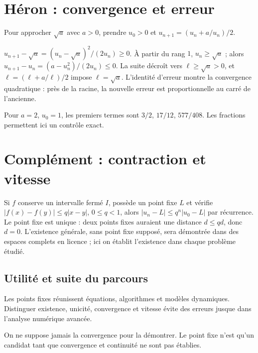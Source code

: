 \documentclass[../cours_tle.tex]{subfiles}
\begin{document}
\section{Héron : convergence et erreur}
Pour approcher $\sqrt a$ avec $a>0$, prendre $u_0>0$ et
$u_{n+1}=(u_n+a/u_n)/2$.
\begin{demonstration}
$u_{n+1}-\sqrt a=(u_n-\sqrt a)^2/(2u_n)\ge0$. À partir du rang $1$, $u_n\ge\sqrt a$ ; alors $u_{n+1}-u_n=(a-u_n^2)/(2u_n)\le0$.
La suite décroît vers $\ell\ge\sqrt a>0$, et $\ell=(\ell+a/\ell)/2$ impose $\ell=\sqrt a$.
L'identité d'erreur montre la convergence quadratique : près de la racine, la nouvelle erreur est proportionnelle au carré de l'ancienne.
\end{demonstration}
Pour $a=2$, $u_0=1$, les premiers termes sont $3/2$, $17/12$, $577/408$. Les fractions permettent ici un contrôle exact.
\section{Complément : contraction et vitesse}
Si $f$ conserve un intervalle fermé $I$, possède un point fixe $L$ et vérifie
$|f(x)-f(y)|\le q|x-y|$, $0\le q<1$, alors
$|u_n-L|\le q^n|u_0-L|$ par récurrence.
Le point fixe est unique : deux points fixes auraient une distance $d\le qd$, donc $d=0$.
L'existence générale, sans point fixe supposé, sera démontrée dans des espaces complets en licence ; ici on établit l'existence dans chaque problème étudié.
\begin{finchapitre}
\section{Utilité et suite du parcours}
Les points fixes réunissent équations, algorithmes et modèles dynamiques. Distinguer existence, unicité, convergence et vitesse évite des erreurs jusque dans l'analyse numérique avancée.
\begin{retenir}
On ne suppose jamais la convergence pour la démontrer. Le point fixe n'est qu'un candidat tant que convergence et continuité ne sont pas établies.
\end{retenir}
\end{finchapitre}
\end{document}

